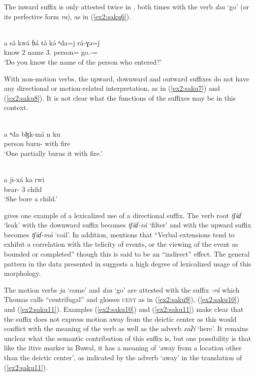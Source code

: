 The inward suffix is only attested twice in \citet{thomasGrammarSakunSukur2014}, both times with the verb \textit{dza} `go' (or its perfective form \textit{ra}), as in (\ref{ex2:saku6}).

\ea\label{ex2:saku6}
 \\
\gll  a sə́ kwá ɓá tə́ kə́ ⁿda=j rá-ɣə=ĵ \\
 know 2 name 3.  person= go.-= \\
\glt `Do you know the name of the person who entered?'
\z 

With non-motion verbs, the upward, downward and outward suffixes do not have any directional or motion-related interpretation, as in (\ref{ex2:saku7}) and (\ref{ex2:saku8}). It is not clear what the functions of the suffixes may be in this context. 

\ea\label{ex2:saku7}
 \\
\gll a ⁿda bɮk-má n ku	\\
 person burn- with fire		\\
\glt `One partially burns it with fire.'

\ex\label{ex2:saku8}
 \\
\gll  a	ji-xá	ka	rwi \\
	bear-	3	child \\
\glt `She bore a child.'
\z 

\citet[119]{thomasGrammarSakunSukur2014} gives one example of a lexicalized use of a directional suffix. The verb root \textit{tʃíɗ} ‘leak’ with the downward suffix becomes \textit{tʃíɗ-xá} ‘filter’ and with the upward suffix becomes \textit{tʃíɗ-má} ‘coil’. In addition, \citet[121]{thomasGrammarSakunSukur2014} mentions that ``Verbal extensions tend to exhibit a correlation with the telicity of events, or the viewing of the event as bounded or completed'' though this is said to be an ``indirect'' effect. The general pattern in the data presented in \citet{thomasGrammarSakunSukur2014} suggests a high degree of lexicalized usage of this morphology.

The motion verbs \textit{ja} `come' and \textit{dza} `go' are attested with the suffix \textit{-rá} which Thomas calls ``centrifugal'' and glosses \textsc{cent} as in (\ref{ex2:saku9}), (\ref{ex2:saku10}) and (\ref{ex2:saku11}). Examples (\ref{ex2:saku10}) and (\ref{ex2:saku11}) make clear that the suffix does not express motion away from the deictic center as this would conflict with the meaning of the verb as well as the adverb \textit{xaʔí} `here'. It remains unclear what the semantic contribution of this suffix is, but one possibility is that like the itive marker in Buwal, it has a meaning of `away from a location other than the deictic center', as indicated by the adverb `away' in the translation of (\ref{ex2:saku11}).

